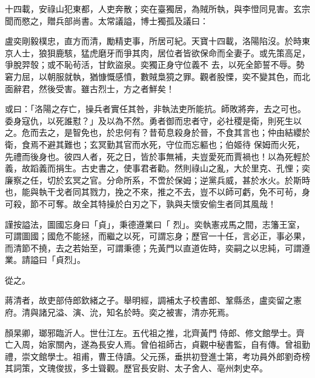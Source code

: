\begin{pinyinscope}
 十四載，安祿山犯東都，人吏奔散；奕在臺獨居，為賊所執，與李憕同見害。玄宗聞而愍之，贈兵部尚書。太常議謚，博士獨孤及議曰：



 盧奕剛毅樸忠，直方而清，勵精吏事，所居可紀。天寶十四載，洛陽陷沒。於時東京人士，狼狽鹿駭，猛虎磨牙而爭其肉，居位者皆欲保命而全妻子。或先策高足，爭脫羿彀；或不恥茍活，甘飲盜泉。奕獨正身守位義不
 去，以死全節誓不辱。勢窘力屈，以朝服就執，猶慷慨感憤，數賊梟獍之罪。觀者股慄，奕不變其色，而北面辭君，然後受害。雖古烈士，方之者鮮矣！



 或曰：「洛陽之存亡，操兵者實任其咎，非執法吏所能抗。師敗將奔，去之可也。委身寇仇，以死誰懟？」及以為不然。勇者御而忠者守，必社稷是衛，則死生以之。危而去之，是智免也，於忠何有？昔荀息殺身於晉，不食其言也；仲由結纓於衛，食焉不避其難也；玄冥勤其官而水死，守位而忘軀也；伯姬待
 保姆而火死，先禮而後身也。彼四人者，死之日，皆於事無補，夫豈愛死而賈禍也！以為死輕於義，故蹈義而捐生。古史書之，使事君者勸。然則祿山之亂，大於里克、孔悝；奕廉察之任，切於玄冥之官。分命所系，不啻於保姆；逆黨兵威，甚於水火。於斯時也，能與執干戈者同其戮力，挽之不來，推之不去，豈不以師可虧，免不可茍，身可殺，節不可奪。故全其特操於白刃之下，孰與夫懷安偷生者同其風哉！



 謹按謚法，圖國忘身曰「貞」，秉德遵業曰「
 烈」。奕執憲戎馬之間，志籓王室，可謂圖國；國危不能拯，而繼之以死，可謂忘身；歷官一十任，言必正，事必果，而清節不撓，去之若始至，可謂秉德；先黃門以直道佐時，奕嗣之以忠純，可謂遵業。請謚曰「貞烈」。



 從之。



 蔣清者，故吏部侍郎欽緒之子。舉明經，調補太子校書郎、鞏縣丞，盧奕留之憲府。清與諸兄溢、演、沇，知名於時。奕之被害，清亦死焉。



 顏杲卿，瑯邪臨沂人。世仕江左。五代祖之推，北齊黃門
 侍郎、修文館學士。齊亡入周，始家關內，遂為長安人焉。曾伯祖師古，貞觀中秘書監，自有傳。曾祖勤禮，崇文館學士。祖甫，曹王侍讀。父元孫，垂拱初登進士第，考功員外郎劉奇榜其詞策，文瑰俊拔，多士聳觀。歷官長安尉、太子舍人、亳州刺史卒。




\end{pinyinscope}
